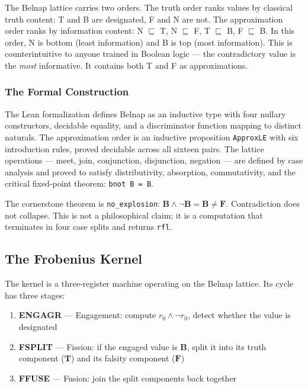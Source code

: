 \documentclass[12pt,a4paper]{article}
\begin{document}
The Belnap lattice carries two orders. The truth order ranks values by classical truth content: T and B are designated, F and N are not. The approximation order ranks by information content: N $\sqsubseteq$ T, N $\sqsubseteq$ F, T $\sqsubseteq$ B, F $\sqsubseteq$ B. In this order, N is bottom (least information) and B is top (most information). This is counterintuitive to anyone trained in Boolean logic --- the contradictory value is the \emph{most} informative. It contains both T and F as approximations.

\subsubsection{The Formal Construction}

The Lean formalization defines Belnap as an inductive type with four nullary constructors, decidable equality, and a discriminator function mapping to distinct naturals. The approximation order is an inductive proposition \texttt{ApproxLE} with six introduction rules, proved decidable across all sixteen pairs. The lattice operations --- meet, join, conjunction, disjunction, negation --- are defined by case analysis and proved to satisfy distributivity, absorption, commutativity, and the critical fixed-point theorem: \texttt{bnot B = B}.

The cornerstone theorem is \texttt{no\_explosion}: $\mathbf{B} \land \neg \mathbf{B} = \mathbf{B} \neq \mathbf{F}$. Contradiction does not collapse. This is not a philosophical claim; it is a computation that terminates in four case splits and returns \texttt{rfl}.

\subsection{The Frobenius Kernel}

The kernel is a three-register machine operating on the Belnap lattice. Its cycle has three stages:

\begin{enumerate}
    \item \textbf{ENGAGR} --- Engagement: compute $r_0 \land \neg r_0$, detect whether the value is designated
    \item \textbf{FSPLIT} --- Fission: if the engaged value is $\mathbf{B}$, split it into its truth component ($\mathbf{T}$) and its falsity component ($\mathbf{F}$)
    \item \textbf{FFUSE} --- Fusion: join the split components back together
\end{enumerate}
\end{document}
